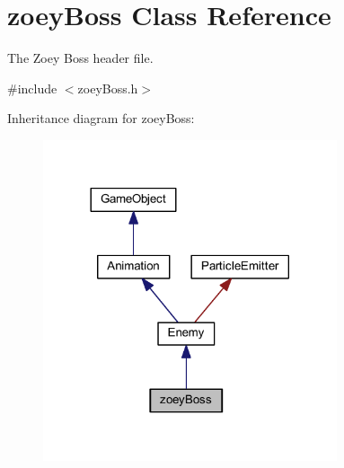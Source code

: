 \hypertarget{classzoey_boss}{\section{zoey\+Boss Class Reference}
\label{classzoey_boss}
}


The Zoey Boss header file.  




{\ttfamily \#include $<$zoey\+Boss.\+h$>$}



Inheritance diagram for zoey\+Boss\+:\nopagebreak
\begin{figure}[H]
\begin{center}
\leavevmode
\includegraphics[width=245pt]{classzoey_boss__inherit__graph}
\end{center}
\end{figure}


